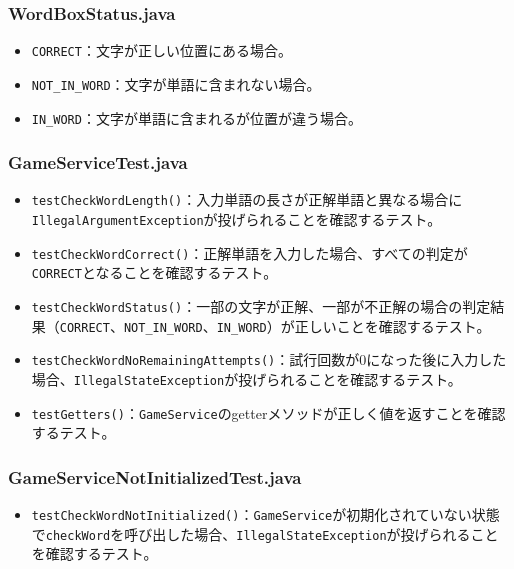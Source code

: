 \documentclass[a4j]{ujarticle}
\begin{document}
\subsubsection{WordBoxStatus.java}

\begin{itemize}
  \item \texttt{CORRECT}：文字が正しい位置にある場合。
  \item \texttt{NOT\_IN\_WORD}：文字が単語に含まれない場合。
  \item \texttt{IN\_WORD}：文字が単語に含まれるが位置が違う場合。
\end{itemize}

\subsubsection{GameServiceTest.java}

\begin{itemize}
  \item \texttt{testCheckWordLength()}：入力単語の長さが正解単語と異なる場合に\texttt{IllegalArgumentException}が投げられることを確認するテスト。
  \item \texttt{testCheckWordCorrect()}：正解単語を入力した場合、すべての判定が\texttt{CORRECT}となることを確認するテスト。
  \item \texttt{testCheckWordStatus()}：一部の文字が正解、一部が不正解の場合の判定結果（\texttt{CORRECT}、\texttt{NOT\_IN\_WORD}、\texttt{IN\_WORD}）が正しいことを確認するテスト。
  \item \texttt{testCheckWordNoRemainingAttempts()}：試行回数が0になった後に入力した場合、\texttt{IllegalStateException}が投げられることを確認するテスト。
  \item \texttt{testGetters()}：\texttt{GameService}のgetterメソッドが正しく値を返すことを確認するテスト。
\end{itemize}

\subsubsection{GameServiceNotInitializedTest.java}

\begin{itemize}
  \item \texttt{testCheckWordNotInitialized()}：\texttt{GameService}が初期化されていない状態で\texttt{checkWord}を呼び出した場合、\texttt{IllegalStateException}が投げられることを確認するテスト。
\end{itemize}
\end{document}
